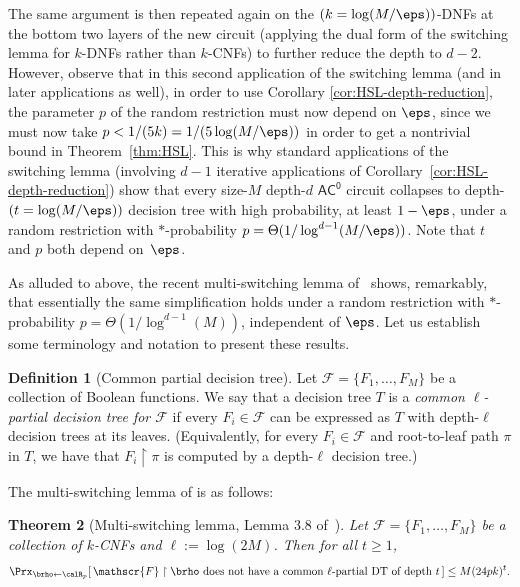 \documentclass[11pt]{article}
\numberwithin{equation}{section}
\newtheorem{theorem}{Theorem}[section]
\theoremstyle{definition}
\newtheorem{definition}[theorem]{Definition}
\theoremstyle{plain}
\theoremstyle{plain}
\newcommand{\acz}{\mathsf{AC^0}}
\newcommand{\uhr}{\upharpoonright}
\begin{document}
The same argument is then repeated again on the $(k= \log(M/\eps))$-DNFs at the bottom two layers of the new circuit (applying the dual form of the switching lemma for $k$-DNFs rather than $k$-CNFs) to further reduce the depth to $d-2$.  However, observe that in this second application of the switching lemma (and in later applications as well), in order to use Corollary \ref{cor:HSL-depth-reduction}, the parameter $p$ of the random restriction must now depend on $\eps$, since we must now take $p < 1/({5k}) =  1/(5\log(M/\eps))$ in order to get a nontrivial bound in Theorem~\ref{thm:HSL}. This is why standard applications of the~\cite{Hastad86} switching lemma (involving $d-1$ iterative applications of Corollary~\ref{cor:HSL-depth-reduction}) show that every size-$M$ depth-$d$ $\acz$ circuit collapses to depth-$(t = \log(M/\eps))$ decision tree with high probability, at least $1-\eps$, under a random restriction with $\ast$-probability $p = \Theta(1/\log^{d-1}(M/\eps))$. Note that $t$ and $p$ both depend on~$\eps$.

As alluded to above, the recent multi-switching lemma of~\cite{Has14} shows, remarkably, that essentially the same simplification holds under a random restriction with $\ast$-probability $p = \Theta(1/\log^{d-1}(M))$, independent of $\eps$. Let us establish some terminology and notation to present these results.

\begin{definition}[Common partial decision tree] 
Let $\mathscr{F} = \{F_1,\ldots,F_M\}$ be a collection of Boolean functions. We say that a decision tree $T$ is a \emph{common $\ell$-partial decision tree for $\mathscr{F}$} if every $F_i \in \mathscr{F}$ can be expressed as $T$ with depth-$\ell$ decision trees at its leaves. (Equivalently, for every $F_i \in \mathscr{F}$ and root-to-leaf path $\pi$ in $T$, we have that $F_i \uhr \pi$ is computed by a depth-$\ell$ decision tree.)  
\end{definition} 


The multi-switching lemma of \cite{Has14} is as follows:

\begin{theorem}[Multi-switching lemma, Lemma 3.8 of~\cite{Has14}]
\label{thm:HSL14}
Let $\mathscr{F} = \{F_1,\ldots,F_M\}$ be a collection of $k$-CNFs and $\ell := \log(2M)$. Then for all $t \ge 1$, 
\[ \Prx_{\brho\leftarrow\calR_p}[\, \mathscr{F}\uhr\brho \text{~does not have a common $\ell$-partial DT of depth $t$}\,] \le M(24pk)^t.  \] 
\end{theorem}
\end{document}
